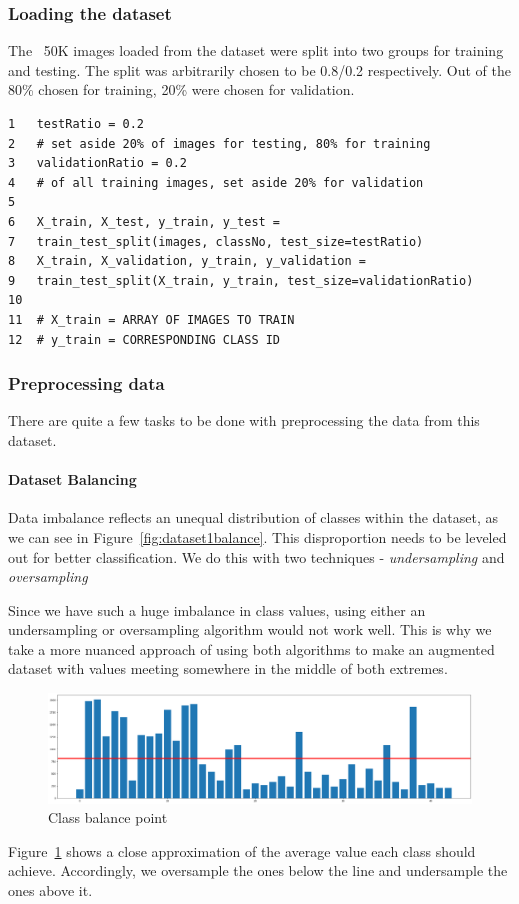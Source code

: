 \documentclass[12pt, landscape]{article}
\begin{document}
\begin{multicols}{3}
\begin{itemize}
  \end{itemize}

\subsubsection{Loading the dataset}
The ~50K images loaded from the dataset were split into two groups for training
and testing. The split was arbitrarily chosen to be 0.8/0.2 respectively. Out of
the 80\% chosen for training, 20\% were chosen for validation.

\color{red}
\begin{Verbatim}[fontsize=\small]
1   testRatio = 0.2 
2   # set aside 20% of images for testing, 80% for training
3   validationRatio = 0.2 
4   # of all training images, set aside 20% for validation
5
6   X_train, X_test, y_train, y_test = 
7   train_test_split(images, classNo, test_size=testRatio)
8   X_train, X_validation, y_train, y_validation = 
9   train_test_split(X_train, y_train, test_size=validationRatio)
10 
11  # X_train = ARRAY OF IMAGES TO TRAIN
12  # y_train = CORRESPONDING CLASS ID
\end{Verbatim}
\color{black}

\subsubsection{Preprocessing data}
There are quite a few tasks to be done with preprocessing the data from this
dataset. 

\paragraph{Dataset Balancing}
Data imbalance reflects an unequal distribution of classes within the dataset,
as we can see in Figure~\ref{fig:dataset1balance}. This disproportion needs to
be leveled out for better classification. We do this with two techniques -
\emph{undersampling} and \emph{oversampling}

Since we have such a huge imbalance in class values, using either an
undersampling or oversampling algorithm would not work well. This is why we take
a more nuanced approach of using both algorithms to make an augmented dataset
with values meeting somewhere in the middle of both extremes.
\begin{figure}[H]
    \centerline{\includegraphics[scale = 0.2]{classbalance.png}}
    \caption{Class balance point}
    \label{fig:dataset1balancemid}
\end{figure}
Figure~\ref{fig:dataset1balancemid} shows a close approximation of the average value
each class should achieve. Accordingly, we oversample the ones below the line
and undersample the ones above it.


\end{multicols}
\end{document}
